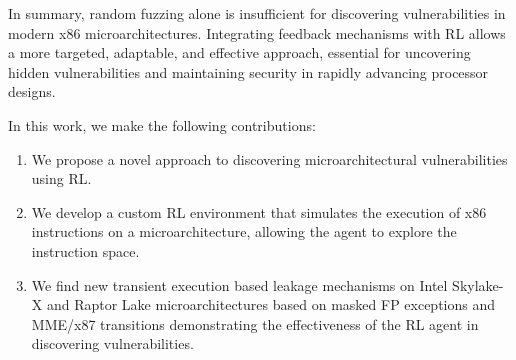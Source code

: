 In summary, random fuzzing alone is insufficient for discovering vulnerabilities in modern x86 microarchitectures. Integrating feedback mechanisms with RL allows a more targeted, adaptable, and effective approach, essential for uncovering hidden vulnerabilities and maintaining security in rapidly advancing processor designs.

In this work, we make the following contributions:
\begin{enumerate}[nosep]
    \item We propose a novel approach to discovering microarchitectural vulnerabilities using RL.
    
    \item We develop a custom RL environment that simulates the execution of x86 instructions on a microarchitecture, allowing the agent to explore the instruction space.
    
    \item We find new transient execution based leakage mechanisms on Intel Skylake-X and Raptor Lake microarchitectures based on masked FP exceptions and MME/x87 transitions demonstrating the effectiveness of the RL agent in discovering vulnerabilities.

\end{enumerate}
